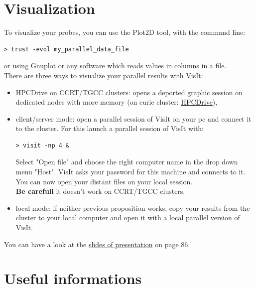 \section{Visualization}
To visualize your probes, you can use the Plot2D tool, with the command line:
\begin{verbatim}
> trust -evol my_parallel_data_file
\end{verbatim}
or using Gnuplot or any software which reads values in columns in a file.\\

There are three ways to visualize your parallel results with VisIt:
\begin{itemize}
\item HPCDrive on CCRT/TGCC clusters: opens a deported graphic session on dedicated nodes with more memory (on curie cluster: \href{https://visu-tgcc.ccc.cea.fr/HPCDrive/home}{HPCDrive}),
\item client/server mode: open a parallel session of VisIt on your pc and connect it to the cluster. For this launch a parallel session of VisIt with:
\begin{verbatim}
> visit -np 4 &
\end{verbatim}
Select "Open file" and choose the right computer name in the drop down menu "Host". VisIt asks your password for this machine and connects to it. You can now open your distant files on your local session.\\
\textbf{Be carefull} it doesn't work on CCRT/TGCC clusters.
\item local mode: if neither previous proposition works, copy your results from the cluster to your local computer and open it with a local parallel version of VisIt.
\end{itemize}

You can have a look at the \href{TRUST_and_TrioCFD_presentation.pdf}{slides of \trust presentation} on page 86.




\section{Useful informations}
